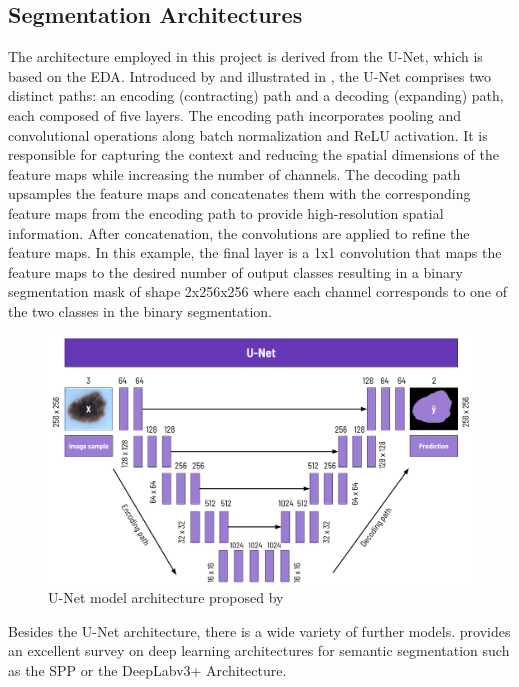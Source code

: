 \subsection{Segmentation Architectures}
\label{subsec:segmentation_architectures}
The architecture employed in this project is derived from the U-Net, which is based on the \ac{EDA}. Introduced by \cite{DBLP:journals/corr/RonnebergerFB15} and illustrated in , the U-Net comprises two distinct paths: an encoding (contracting) path and a decoding (expanding) path, each composed of five layers. The encoding path incorporates pooling and convolutional operations along batch normalization and ReLU activation. It is responsible for capturing the context and reducing the spatial dimensions of the feature maps while increasing the number of channels. The decoding path upsamples the feature maps and concatenates them with the corresponding feature maps from the encoding path to provide high-resolution spatial information. After concatenation, the convolutions are applied to refine the feature maps. In this example, the final layer is a 1x1 convolution that maps the feature maps to the desired number of output classes resulting in a binary segmentation mask of shape 2x256x256 where each channel corresponds to one of the two classes in the binary segmentation.\cite{DBLP:journals/corr/RonnebergerFB15}
\begin{figure}[H]%
    \centering
    \includegraphics[width=\imgWidthXL]{images/NetworkArchitecture.png}
    \caption[U-Net]{U-Net model architecture proposed by \cite{DBLP:journals/corr/RonnebergerFB15}}
    \label{network_architecture}
\end{figure}
Besides the U-Net architecture, there is a wide variety of further models. \cite{doi:10.1080/08839514.2022.2032924} provides an excellent survey on deep learning architectures for semantic segmentation such as the \ac{SPP} \cite{doi:10.1080/08839514.2022.2032924} or the DeepLabv3+ Architecture\cite{Chen_2018_ECCV}.

